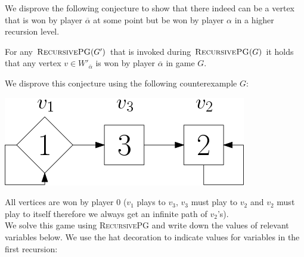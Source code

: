 We disprove the following conjecture to show that there indeed can be a vertex that is won by player $\overline{\alpha}$ at some point but be won by player $\alpha$ in a higher recursion level.
\begin{conjecture}[Disproven]
	For any $\textsc{RecursivePG}(G')$ that is invoked during $\textsc{RecursivePG}(G)$ it holds that any vertex $v \in W'_{\overline{\alpha}}$ is won by player $\overline{\alpha}$ in game $G$.
\end{conjecture}
We disprove this conjecture using the following counterexample $G$:\\
\begin{center}
	\includegraphics[scale=0.4]{counterexampleBconjecture}\\
\end{center}
All vertices are won by player $0$ ($v_1$ plays to $v_3$, $v_3$ must play to $v_2$ and $v_2$ must play to itself therefore we always get an infinite path of $v_2$'s).\\
We solve this game using \textsc{RecursivePG} and write down the values of relevant variables below. We use the hat decoration to indicate values for variables in the first recursion:\\
